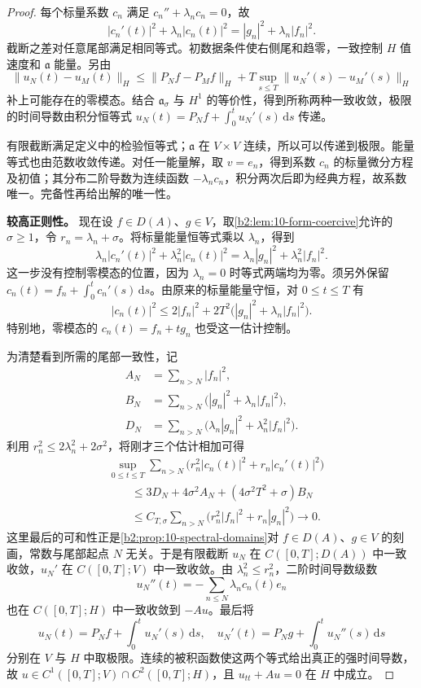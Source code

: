 \begin{proof}
每个标量系数 \(c_n\) 满足 \(c_n''+\lambda_nc_n=0\)，故
\[
 |c_n'(t)|^2+\lambda_n|c_n(t)|^2
 =|g_n|^2+\lambda_n|f_n|^2.
\]
截断之差对任意尾部满足相同等式。初数据条件使右侧尾和趋零，一致控制 \(H\) 值速度和 \(\mathfrak a\) 能量。另由
\[
 \|u_N(t)-u_M(t)\|_H
 \leq\|P_Nf-P_Mf\|_H
 +T\sup_{s\leq T}\|u_N'(s)-u_M'(s)\|_H
\]
补上可能存在的零模态。结合 \(\mathfrak a_\sigma\) 与 \(H^1\) 的等价性，得到所称两种一致收敛，极限的时间导数由积分恒等式 \(u_N(t)=P_Nf+\int_0^tu_N'(s)\,\mathrm{d}s\) 传递。

有限截断满足定义中的检验恒等式；\(\mathfrak a\) 在 \(V\times V\) 连续，所以可以传递到极限。能量等式也由范数收敛传递。对任一能量解，取 \(v=e_n\)，得到系数 \(c_n\) 的标量微分方程及初值；其分布二阶导数为连续函数 \(-\lambda_nc_n\)，积分两次后即为经典方程，故系数唯一。完备性再给出解的唯一性。

\textbf{较高正则性。}
现在设 \(f\in D(A)\)、\(g\in V\)，取\cref{b2:lem:10-form-coercive}允许的 \(\sigma\geq1\)，令 \(r_n=\lambda_n+\sigma\)。将标量能量恒等式乘以 \(\lambda_n\)，得到
\[
 \lambda_n|c_n'(t)|^2+\lambda_n^2|c_n(t)|^2
 =\lambda_n|g_n|^2+\lambda_n^2|f_n|^2.
\]
这一步没有控制零模态的位置，因为 \(\lambda_n=0\) 时等式两端均为零。须另外保留 \(c_n(t)=f_n+\int_0^tc_n'(s)\,\mathrm{d}s\)。由原来的标量能量守恒，对 \(0\leq t\leq T\) 有
\[
 |c_n(t)|^2\leq2|f_n|^2
     +2T^2\bigl(|g_n|^2+\lambda_n|f_n|^2\bigr).
\]
特别地，零模态的 \(c_n(t)=f_n+tg_n\) 也受这一估计控制。

为清楚看到所需的尾部一致性，记
\[
 \begin{aligned}
 A_N&=\sum_{n>N}|f_n|^2,\\
 B_N&=\sum_{n>N}\bigl(|g_n|^2+\lambda_n|f_n|^2\bigr),\\
 D_N&=\sum_{n>N}\bigl(\lambda_n|g_n|^2+\lambda_n^2|f_n|^2\bigr).
 \end{aligned}
\]
利用 \(r_n^2\leq2\lambda_n^2+2\sigma^2\)，将刚才三个估计相加可得
\begin{equation}\label{b2:eq:10-wave-higher-tail}
 \begin{aligned}
 &\sup_{0\leq t\leq T}\sum_{n>N}
 \bigl(r_n^2|c_n(t)|^2+r_n|c_n'(t)|^2\bigr)\\
 &\qquad\leq3D_N+4\sigma^2 A_N
                 +(4\sigma^2T^2+\sigma)B_N\\
 &\qquad\leq C_{T,\sigma}\sum_{n>N}
            \bigl(r_n^2|f_n|^2+r_n|g_n|^2\bigr)
 \longrightarrow0.
 \end{aligned}
\end{equation}
这里最后的可和性正是\cref{b2:prop:10-spectral-domains}对 \(f\in D(A)\)、\(g\in V\) 的刻画，常数与尾部起点 \(N\) 无关。于是有限截断 \(u_N\) 在 \(C([0,T];D(A))\) 中一致收敛，\(u_N'\) 在 \(C([0,T];V)\) 中一致收敛。由 \(\lambda_n^2\leq r_n^2\)，二阶时间导数级数
\[
 u_N''(t)=-\sum_{n\leq N}\lambda_nc_n(t)e_n
\]
也在 \(C([0,T];H)\) 中一致收敛到 \(-Au\)。最后将
\[
 u_N(t)=P_Nf+\int_0^tu_N'(s)\,\mathrm{d}s,
 \quad
 u_N'(t)=P_Ng+\int_0^tu_N''(s)\,\mathrm{d}s
\]
分别在 \(V\) 与 \(H\) 中取极限。连续的被积函数使这两个等式给出真正的强时间导数，故 \(u\in C^1([0,T];V)\cap C^2([0,T];H)\)，且 \(u_{tt}+Au=0\) 在 \(H\) 中成立。
\end{proof}

